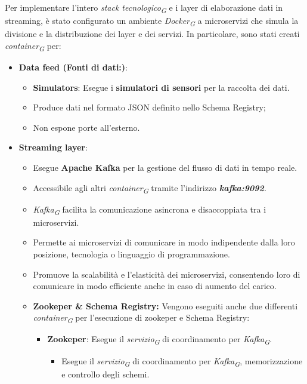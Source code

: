 Per implementare l'intero \textit{stack tecnologico}\textsubscript{\textit{G}} e i layer di elaborazione dati in streaming, è stato configurato un ambiente \textit{Docker}\textsubscript{\textit{G}} a microservizi che simula la divisione e la distribuzione dei layer e dei servizi. In particolare, sono stati creati \textit{container}\textsubscript{\textit{G}} per:
\begin{itemize}
    \item \textbf{Data feed (Fonti di dati:)}:
    \begin{itemize}
        \item \textbf{Simulators}: Esegue i \textbf{simulatori di sensori} per la raccolta dei dati.
        \item Produce dati nel formato JSON definito nello Schema Registry;
        \item Non espone porte all’esterno.
    \end{itemize} 
    \item \textbf{Streaming layer}:
    \begin{itemize}
        \item Esegue \textbf{Apache Kafka} per la gestione del flusso di dati in tempo reale.
        \item Accessibile agli altri \textit{container}\textsubscript{\textit{G}} tramite l'indirizzo \textit{\textbf{kafka:9092}}.
        \item \textit{Kafka}\textsubscript{\textit{G}} facilita la comunicazione asincrona e disaccoppiata tra i microservizi.
        \item Permette ai microservizi di comunicare in modo indipendente dalla loro posizione, tecnologia o linguaggio di programmazione.
        \item Promuove la scalabilità e l'elasticità dei microservizi, consentendo loro di comunicare in modo efficiente anche in caso di aumento del carico.
        \item \textbf{Zookeper \& Schema Registry:} Vengono eseguiti anche due differenti \textit{container}\textsubscript{\textit{G}} per l'esecuzione di zookeper e Schema Registry:
            \begin{itemize}
                \item \textbf{Zookeper}: Esegue il \textit{servizio}\textsubscript{\textit{G}} di coordinamento per \textit{Kafka}\textsubscript{\textit{G}}.
                \begin{itemize}
                    \item Esegue il \textit{servizio}\textsubscript{\textit{G}} di coordinamento per \textit{Kafka}\textsubscript{\textit{G}}, memorizzazione e controllo degli schemi.

\end{itemize}
\end{itemize}
\end{itemize}
\end{itemize}
